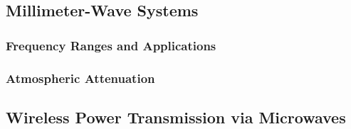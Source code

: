\documentclass[11pt]{article}
\begin{document}
\subsection{Millimeter-Wave Systems} \label{subsec:mm_wave}
\subsubsection{Frequency Ranges and Applications}
\subsubsection{Atmospheric Attenuation}
\subsection{Wireless Power Transmission via Microwaves}
\label{subsec:wireless_power}

\newpage
\ifdefined\HCode
\else
{}
\fi
\printbibliography
\end{document}
